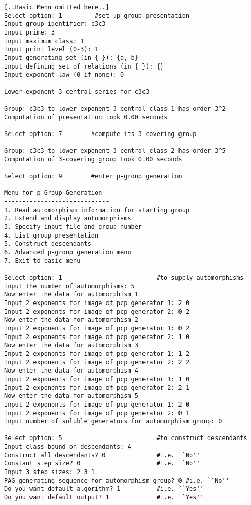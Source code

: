\documentclass[12pt]{article}
\begin{document}
\begin{verbatim}
[..Basic Menu omitted here..]
Select option: 1         #set up group presentation
Input group identifier: c3c3
Input prime: 3
Input maximum class: 1
Input print level (0-3): 1
Input generating set (in { }): {a, b}
Input defining set of relations (in { }): {}
Input exponent law (0 if none): 0

Lower exponent-3 central series for c3c3

Group: c3c3 to lower exponent-3 central class 1 has order 3^2
Computation of presentation took 0.00 seconds

Select option: 7        #compute its 3-covering group 

Group: c3c3 to lower exponent-3 central class 2 has order 3^5
Computation of 3-covering group took 0.00 seconds

Select option: 9        #enter p-group generation 

Menu for p-Group Generation
-----------------------------
1. Read automorphism information for starting group
2. Extend and display automorphisms
3. Specify input file and group number
4. List group presentation
5. Construct descendants
6. Advanced p-group generation menu
7. Exit to basic menu

Select option: 1                          #to supply automorphisms 
Input the number of automorphisms: 5
Now enter the data for automorphism 1
Input 2 exponents for image of pcp generator 1: 2 0
Input 2 exponents for image of pcp generator 2: 0 2
Now enter the data for automorphism 2
Input 2 exponents for image of pcp generator 1: 0 2
Input 2 exponents for image of pcp generator 2: 1 0
Now enter the data for automorphism 3
Input 2 exponents for image of pcp generator 1: 1 2
Input 2 exponents for image of pcp generator 2: 2 2 
Now enter the data for automorphism 4
Input 2 exponents for image of pcp generator 1: 1 0
Input 2 exponents for image of pcp generator 2: 2 1
Now enter the data for automorphism 5
Input 2 exponents for image of pcp generator 1: 2 0
Input 2 exponents for image of pcp generator 2: 0 1
Input number of soluble generators for automorphism group: 0

Select option: 5                          #to construct descendants
Input class bound on descendants: 4
Construct all descendants? 0              #i.e. ``No''
Constant step size? 0                     #i.e. ``No''
Input 3 step sizes: 2 3 1
PAG-generating sequence for automorphism group? 0 #i.e. ``No''
Do you want default algorithm? 1          #i.e. ``Yes''
Do you want default output? 1             #i.e. ``Yes''


\end{verbatim}
\end{document}
